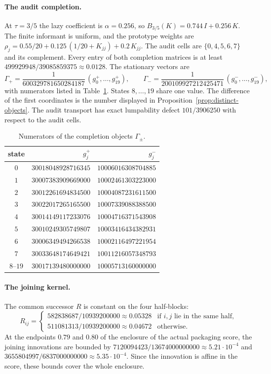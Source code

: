 \paragraph{The audit completion.}
At $\tau=3/5$ the lazy coefficient is $\alpha=0.256$, so $B_{3/5}(K)=0.744\,I+0.256\,K$. The finite informant is uniform, and the prototype weights are $\rho_j=0.55/20+0.125\,(1/20+K_{jj})+0.2\,K_{jj}$. The audit cells are $\{0,4,5,6,7\}$ and its complement. Every entry of both completion matrices is at least $499929948/39085859375\approx0.0128$. The stationary vectors are
\[
\Gamma_+=\frac{1}{600329781650284187}\,(g^+_0,\dots,g^+_{19}),\qquad
\Gamma_-=\frac{1}{200109927212425471}\,(g^-_0,\dots,g^-_{19}),
\]
with numerators listed in Table~\ref{tbl:warm-objects}. States $8,\dots,19$ share one value. The difference of the first coordinates is the number displayed in Proposition~\ref{prop:distinct-objects}. The audit transport has exact lumpability defect $101/3906250$ with respect to the audit cells.

\begin{table}[h]
\caption{Numerators of the completion objects $\Gamma_\pm$.}
\label{tbl:warm-objects}
\centering
\small
\begin{tabular}{@{}c r r@{}}
\toprule
state & $g^+_j$ & $g^-_j$ \\
\midrule
$0$ & $30018048928716345$ & $10006016308704885$ \\
$1$ & $30007383909669000$ & $10002461303223000$ \\
$2$ & $30012261694834500$ & $10004087231611500$ \\
$3$ & $30022017265165500$ & $10007339088388500$ \\
$4$ & $30014149117233076$ & $10004716371543908$ \\
$5$ & $30010249305749807$ & $10003416434382931$ \\
$6$ & $30006349494266538$ & $10002116497221954$ \\
$7$ & $30033648174649421$ & $10011216057348793$ \\
$8$--$19$ & $30017139480000000$ & $10005713160000000$ \\
\bottomrule
\end{tabular}
\end{table}

\paragraph{The joining kernel.}
The common successor $R$ is constant on the four half-blocks:
\[
R_{ij}=\begin{cases}582838687/10939200000\approx0.05328 & \text{if $i,j$ lie in the same half},\\ 511081313/10939200000\approx0.04672 & \text{otherwise}.\end{cases}
\]
At the endpoints $0.79$ and $0.80$ of the enclosure of the actual packaging score, the joining innovations are bounded by $7120094423/13674000000000\approx5.21\cdot10^{-4}$ and $3655804997/6837000000000\approx5.35\cdot10^{-4}$. Since the innovation is affine in the score, these bounds cover the whole enclosure.

